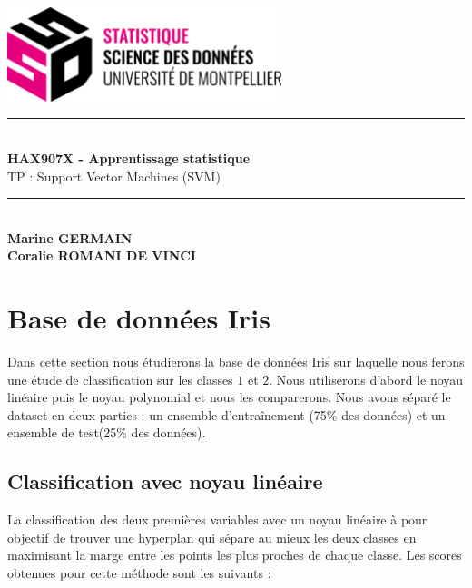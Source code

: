 \documentclass[a4paper,12pt]{article}
\begin{document}
\begin{titlepage}

    \vspace*{4cm}

    \centering
    
    \includegraphics[width=0.6\textwidth]{Images/logo.png} \\[1.5cm]
    
    \rule{\linewidth}{1pt} \\[1cm]

    {\Huge \bfseries HAX907X - Apprentissage statistique}\\[0.5cm]
    {\Huge TP : Support Vector Machines (SVM)}\\[1cm]
    
    \rule{\linewidth}{1pt} \\[2cm]

    {\Large \textbf{Marine GERMAIN}}\\
    {\Large \textbf{Coralie ROMANI DE VINCI}}\\[1cm]
    

\end{titlepage}


\renewcommand{\contentsname}{Table des matières}
\tableofcontents


\newpage

\section{Base de données Iris}

Dans cette section nous étudierons la base de données Iris sur laquelle nous ferons une étude de classification sur les classes $1$ et $2$.
Nous utiliserons d'abord le noyau linéaire puis le noyau polynomial et nous les comparerons.
Nous avons séparé le dataset en deux parties : un ensemble d'entraînement (75\% des données) et un ensemble de test(25\% des données). 

\subsection{Classification avec noyau linéaire}

La classification des deux premières variables avec un noyau linéaire à pour objectif de trouver une hyperplan qui sépare au mieux les deux classes en maximisant la marge entre les points les plus proches de chaque classe. 
Les scores obtenues pour cette méthode sont les suivants :
\end{document}
